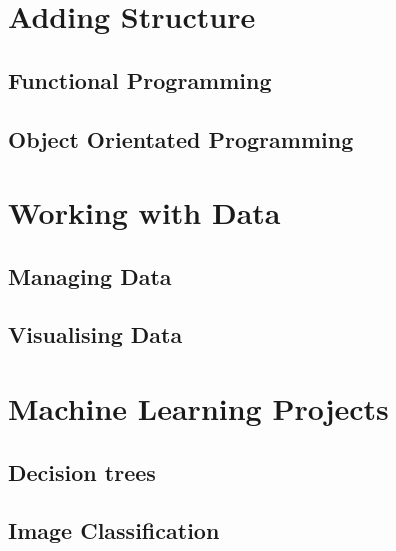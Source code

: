\part{Adding Structure}
\newpage
\chapter{Functional Programming} \label{ch:Functional}


\chapter{Object Orientated Programming} 
\label{ch:OOP}

\part{Working with Data} 
\label{ch:Data}
\chapter{Managing Data} \label{ch:ManagingData}

\chapter{Visualising Data} \label{ch:Graphs}


\part{Machine Learning Projects} 
\label{ch:MLProject}
\chapter{Decision trees}\label{ch:DecisionTrees}

\chapter{Image Classification}\label{ch:ImageClass}


